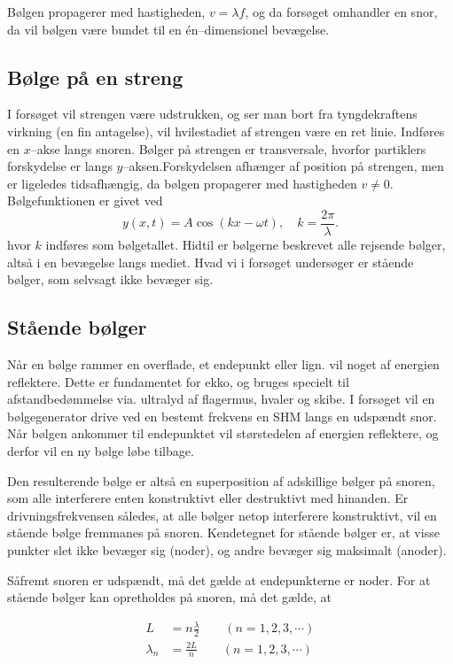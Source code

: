 \documentclass[A2_main.tex]{subfiles}
\begin{document}
Bølgen propagerer med hastigheden, $v = \lambda f$, og da forsøget omhandler en snor, da vil bølgen være bundet til en én--dimensionel bevægelse.

\subsection{Bølge på en streng}
I forsøget vil strengen være udstrukken, og ser man bort fra tyngdekraftens virkning (en fin antagelse), vil hvilestadiet af strengen være en ret linie. Indføres en $x$--akse langs snoren. Bølger på strengen er transversale, hvorfor partiklers forskydelse er langs $y$--aksen.Forskydelsen afhænger af position på strengen, men er ligeledes tidsafhængig, da bølgen propagerer med hastigheden $v\neq 0$. Bølgefunktionen er givet ved
\begin{equation}
    y(x, t) = A\cos(kx -\omega t), \quad k = \frac{2\pi}{\lambda}.
    \label{eq: wave}
\end{equation}
hvor $k$ indføres som bølgetallet. Hidtil er bølgerne beskrevet alle rejsende bølger, altså i en bevægelse langs mediet. Hvad vi i forsøget undersøger er stående bølger, som selvsagt ikke bevæger sig.

\subsection{Stående bølger}
Når en bølge rammer en overflade, et endepunkt eller lign. vil noget af energien reflektere. Dette er fundamentet for ekko, og bruges specielt til afstandbedømmelse via. ultralyd af flagermus, hvaler og skibe. I forsøget vil en bølgegenerator drive ved en bestemt frekvens en SHM langs en udspændt snor. Når bølgen ankommer til endepunktet vil størstedelen af energien reflektere, og derfor vil en ny bølge løbe tilbage. 

Den resulterende bølge er altså en superposition af adskillige bølger på snoren, som alle interferere enten konstruktivt eller destruktivt med hinanden. Er drivningsfrekvensen således, at alle bølger netop interferere konstruktivt, vil en stående bølge fremmanes på snoren. Kendetegnet for stående bølger er, at visse punkter slet ikke bevæger sig (noder), og andre bevæger sig maksimalt (anoder).

Såfremt snoren er udspændt, må det gælde at endepunkterne er noder. For at stående bølger kan opretholdes på snoren, må det gælde, at

\begin{align}
    L & = n \frac{\lambda}{2} \qquad (n = 1,2,3, \cdots)\\
    \lambda_n &= \frac{2L}{n} \qquad (n=1,2,3,\cdots)
    \label{eq: L}
\end{align}
\end{document}
